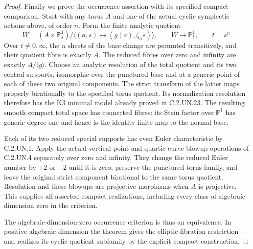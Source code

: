 \begin{proof}
Finally we prove the occurrence assertion with its
specified compact comparison. Start with any torus
$A$ and one of the actual cyclic symplectic actions
above, of order $n$. Form the finite analytic quotient
\[
 W=(A\times\mathbb P^1_s)/
       \langle(a,s)\mapsto(g(a),\zeta_ns)\rangle,
 \qquad W\longrightarrow\mathbb P^1_t,
 \qquad t=s^n.
                                                               \tag{C.K3.10}
\]
Over $t\ne0,\infty$, the $n$ sheets of the base
change are permuted transitively, and their quotient
fibre is exactly $A$. The reduced fibres over zero
and infinity are exactly $A/\langle g\rangle$.
Choose an analytic resolution of the total quotient
and its two central supports, isomorphic over the
punctured base and at a generic point of each of
these two original components. The strict transform
of the latter maps properly birationally to the
specified torus quotient. Its normalization resolution
therefore has the K3 minimal model already proved
in C.2.UN.23. The resulting smooth compact total
space has connected fibres: its Stein factor over
$\mathbb P^1$ has generic degree one and hence is
the identity finite map to the normal base.

Each of its two reduced special supports has even
Euler characteristic by C.2.UN.1. Apply the actual
vertical point and quartic-curve blowup operations
of C.2.UN.4 separately over zero and infinity.
They change the reduced Euler number by $+2$ or
$-2$ until it is zero, preserve the punctured torus
family, and leave the original strict component
birational to the same torus quotient. Resolution
and these blowups are projective morphisms when
$A$ is projective. This supplies all asserted
compact realizations, including every class of
algebraic dimension zero in the criterion.

The algebraic-dimension-zero occurrence criterion
is thus an equivalence. In positive algebraic
dimension the theorem gives the elliptic-fibration
restriction and realizes its cyclic quotient
subfamily by the explicit compact construction.
\end{proof}
